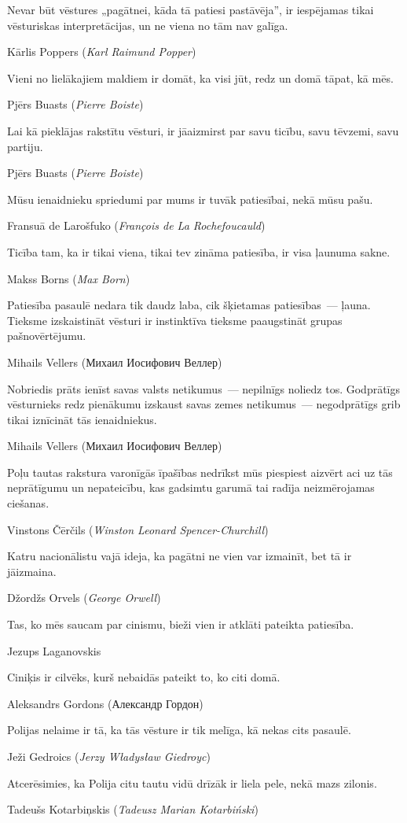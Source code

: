 \documentclass[twoside,a5paper,12pt,fleqn,openany]{extbook}
\newcommand{\pltxti}[1]{\textit{\textpolish{#1}}}
\newcommand{\rutxti}[1]{\textrussian{#1}}
\newcommand{\frtxti}[1]{\textit{\textfrench{#1}}}
\newcommand{\entxti}[1]{\textit{\textenglish{#1}}}
\begin{document}
\epigraph
{Nevar būt vēstures „pagātnei, kāda tā patiesi pastāvēja”, ir iespējamas tikai vēsturiskas interpretācijas, un ne viena no tām nav galīga.}
{Kārlis Poppers (\entxti{Karl Raimund Popper})}

\epigraph
{Vieni no lielākajiem maldiem ir domāt, ka visi jūt, redz un domā tāpat, kā mēs.}
{Pjērs Buasts (\frtxti{Pierre Boiste})}

\epigraph
{Lai kā pieklājas rakstītu vēsturi, ir jāaizmirst par savu ticību, savu tēvzemi, savu partiju.}
{Pjērs Buasts (\frtxti{Pierre Boiste})}



\epigraph
{Mūsu ienaidnieku spriedumi par mums ir tuvāk patiesībai, nekā mūsu pašu.}
{Fransuā de Larošfuko (\frtxti{François de La Rochefoucauld})}

\epigraph
{Ticība tam, ka ir tikai viena, tikai tev zināma patiesība, ir visa ļaunuma sakne.}
{Makss Borns (\entxti{Max Born})}

\epigraph
{Patiesība pasaulē nedara tik daudz laba, cik šķietamas patiesības~--- ļauna. Tieksme izskaistināt vēsturi ir instinktīva tieksme paaugstināt grupas pašnovērtējumu.}
{Mihails Vellers (\rutxti{Михаил Иосифович Веллер})}

\epigraph
{Nobriedis prāts ienīst savas valsts netikumus~--- nepilnīgs noliedz tos. Godprātīgs vēsturnieks redz pienākumu izskaust savas zemes netikumus~--- negodprātīgs grib tikai iznīcināt tās ienaidniekus.}
{Mihails Vellers (\rutxti{Михаил Иосифович Веллер})}

\epigraph
{Poļu tautas rakstura varonīgās īpašības nedrīkst mūs piespiest aizvērt aci uz tās neprātīgumu un nepateicību, kas gadsimtu garumā tai radīja neizmērojamas ciešanas.}
{Vinstons Čērčils (\entxti{Winston Leonard Spencer-Churchill})}



\epigraph
{Katru nacionālistu vajā ideja, ka pagātni ne vien var izmainīt, bet tā ir jāizmaina.}
{Džordžs Orvels (\entxti{George Orwell})}

\epigraph
{Tas, ko mēs saucam par cinismu, bieži vien ir atklāti pateikta patiesība.}
{Jezups Laganovskis}

\epigraph
{Ciniķis ir cilvēks, kurš nebaidās pateikt to, ko citi domā.}
{Aleksandrs Gordons (\rutxti{Александр Гордон})}

\epigraph
{Polijas nelaime ir tā, ka tās vēsture ir tik melīga, kā nekas cits pasaulē.}
{Ježi Gedroics (\pltxti{Jerzy Władysław Giedroyc})}

\epigraph
{Atcerēsimies, ka Polija citu tautu vidū drīzāk ir liela pele, nekā mazs zilonis.}
{Tadeušs Kotarbiņskis (\pltxti{Tadeusz Marian Kotarbiński})}
\end{document}
